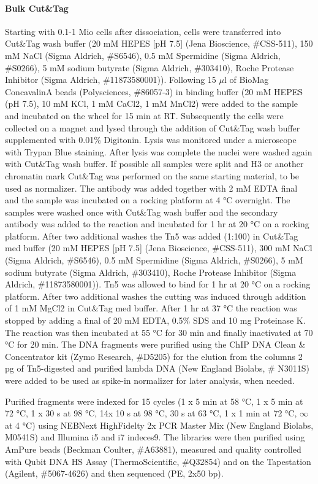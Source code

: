 \paragraph{Bulk Cut\&Tag}
Starting with 0.1-1 Mio cells after dissociation, cells were transferred into Cut\&Tag wash buffer (20 mM HEPES [pH 7.5] (Jena Bioscience, \#CSS-511), 150 mM NaCl (Sigma Aldrich, \#S6546), 0.5 mM Spermidine (Sigma Aldrich, \#S0266), 5 mM sodium butyrate (Sigma Aldrich, \#303410), Roche Protease Inhibitor (Sigma Aldrich, \#11873580001)). Following 15 $\mu$l of BioMag ConcavalinA beads (Polysciences, \#86057-3) in binding buffer (20 mM HEPES (pH 7.5), 10 mM KCl, 1 mM CaCl2, 1 mM MnCl2) were added to the sample and incubated on the wheel for 15 min at RT. Subsequently the cells were collected on a magnet and lysed through the addition of Cut\&Tag wash buffer supplemented with 0.01\% Digitonin. Lysis was monitored under a microscope with Trypan Blue staining. After lysis was complete the nuclei were washed again with Cut\&Tag wash buffer. If possible all samples were split and H3 or another chromatin mark Cut\&Tag was performed on the same starting material, to be used as normalizer. The antibody was added together with 2 mM EDTA final and the sample was incubated on a rocking platform at 4 °C overnight.  
The samples were washed once with Cut\&Tag wash buffer and the secondary antibody was added to the reaction and incubated for 1 hr at 20 °C on a rocking platform. After two additional washes the Tn5 was added (1:100) in Cut\&Tag med buffer (20 mM HEPES [pH 7.5] (Jena Bioscience, \#CSS-511), 300 mM NaCl (Sigma Aldrich, \#S6546), 0.5 mM Spermidine (Sigma Aldrich, \#S0266), 5 mM sodium butyrate (Sigma Aldrich, \#303410), Roche Protease Inhibitor (Sigma Aldrich, \#11873580001)). Tn5 was allowed to bind for 1 hr at 20 °C on a rocking platform. After two additional washes the cutting was induced through addition of 1 mM MgCl2 in Cut\&Tag med buffer. After 1 hr at 37 °C the reaction was stopped by adding a final of 20 mM EDTA, 0.5\% SDS and 10 mg Proteinase K. The reaction was then incubated at 55 °C for 30 min and finally inactivated at 70 °C for 20 min.
 The DNA fragments were purified using the ChIP DNA Clean \& Concentrator kit (Zymo Research, \#D5205) for the elution from the columns 2 pg of Tn5-digested and purified lambda DNA (New England Biolabs, \# N3011S) were added to be used as spike-in normalizer for later analysis, when needed.

Purified fragments were indexed for 15 cycles (1 x 5 min at 58 °C, 1 x 5 min at 72 °C, 1 x	30 s at 98 °C, 14x 10 s at 98 °C, 30 s at 63 °C, 1 x 1 min at 72 °C, $\infty$ at 4 °C) using NEBNext HighFidelty 2x PCR Master Mix (New England Biolabs, M0541S) and Illumina i5 and i7 indeces9. The libraries were then purified using AmPure beads (Beckman Coulter, \#A63881), measured and quality controlled with Qubit DNA HS Assay (ThermoScientific, \#Q32854) and on the Tapestation (Agilent, \#5067-4626) and then sequenced (PE, 2x50 bp).

